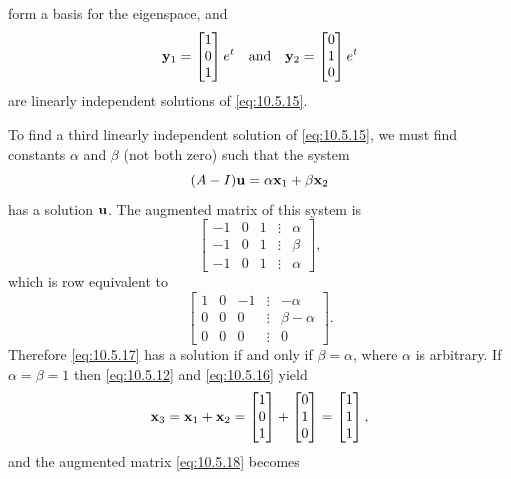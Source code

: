 \documentclass{ximera}
\begin{document}
\begin{example}
\begin{explanation}
\begin{equation}
\end{equation}
form a basis for the eigenspace, and
$$
{\bf y}_1  =\begin{bmatrix}1\\0\\1\end{bmatrix}e^t\quad\mbox{and}\quad {\bf y}_2=\begin{bmatrix}0\\1\\0\end{bmatrix}e^t
$$
are linearly independent solutions of   \eqref{eq:10.5.15}.

To find a third linearly independent solution of  \eqref{eq:10.5.15}, we
must
find constants $\alpha$  and $\beta$ (not both zero) such that the system
\begin{equation}\label{eq:10.5.17}
(A-I){\bf u}=\alpha{\bf x}_1+\beta{\bf x}_2
\end{equation}
has a solution ${\bf u}$. The augmented matrix of this system is
$$
\begin{bmatrix} -1 & 0 & 1 &\vdots &\alpha\\
-1& 0 & 1 &\vdots &\beta\\ -1 & 0 & 1 &
\vdots &\alpha\end{bmatrix}, $$
which is row equivalent to
\begin{equation}\label{eq:10.5.18}
\begin{bmatrix} 1 & 0 &- 1 &\vdots& -\alpha\\ 0 & 0 & 0
&\vdots&\beta-\alpha\\ 0 & 0 & 0 &\vdots&0\end{bmatrix}.
\end{equation}
Therefore  \eqref{eq:10.5.17} has a solution if and only if
$\beta=\alpha$, where $\alpha$ is arbitrary. If
$\alpha=\beta=1$ then \eqref{eq:10.5.12} and \eqref{eq:10.5.16} yield
$$
{\bf x}_3={\bf x}_1+{\bf x}_2=
\begin{bmatrix}1\\0\\1\end{bmatrix}+\begin{bmatrix}0\\1\\0\end{bmatrix}=\begin{bmatrix}1\\1\\1\end{bmatrix},
$$
and the augmented matrix \eqref{eq:10.5.18}  becomes
$$
$$
\end{explanation}
\end{example}
\end{document}
